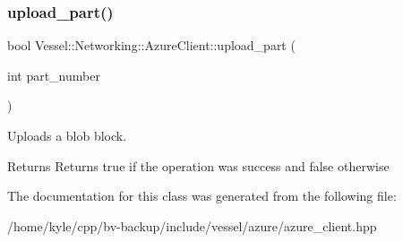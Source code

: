 \subsubsection{\texorpdfstring{upload\+\_\+part()}{upload\_part()}}
{\footnotesize\ttfamily bool Vessel\+::\+Networking\+::\+Azure\+Client\+::upload\+\_\+part (\begin{DoxyParamCaption}\item[{int}]{part\+\_\+number }\end{DoxyParamCaption})}



Uploads a blob block. 

\begin{DoxyReturn}{Returns}
Returns true if the operation was success and false otherwise 
\end{DoxyReturn}


The documentation for this class was generated from the following file\+:\begin{DoxyCompactItemize}
\item 
/home/kyle/cpp/bv-\/backup/include/vessel/azure/azure\+\_\+client.\+hpp\end{DoxyCompactItemize}
